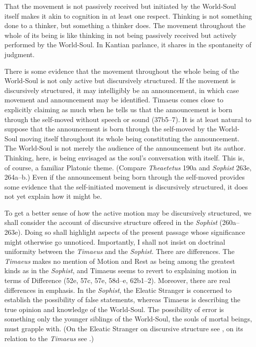 That the movement is not passively received but initiated by the World-Soul itself makes it akin to cognition in at least one respect. Thinking is not something done to a thinker, but something a thinker does. The movement throughout the whole of its being is like thinking in not being passively received but actively performed by the World-Soul. In Kantian parlance, it shares in the spontaneity of judgment.

There is some evidence that the movement throughout the whole being of the World-Soul is not only active but discursively structured. If the movement is discursively structured, it may intelligibly be an announcement, in which case movement and announcement may be identified. Timaeus comes close to explicitly claiming as much when he tells us that the announcement is born through the self-moved without speech or sound (37b5--7). It is at least natural to suppose that the announcement is born through the self-moved by the World-Soul moving itself throughout its whole being constituting the announcement. The World-Soul is not merely the audience of the announcement but its author. Thinking, here, is being envisaged as the soul's conversation with itself. This is, of course, a familiar Platonic theme. (Compare \emph{Theaetetus} 190a and \emph{Sophist} 263e, 264a--b.) Even if the announcement being born through the self-moved provides some evidence that the self-initiated movement is discursively structured, it does not yet explain how it might be.

To get a better sense of how the active motion may be discursively structured, we shall consider the account of discursive structure offered in the \emph{Sophist} (260a--263e). Doing so shall highlight aspects of the present passage whose significance might otherwise go unnoticed. Importantly, I shall not insist on doctrinal uniformity between the \emph{Timaeus} and the \emph{Sophist}. There are differences. The \emph{Timaeus} makes no mention of Motion and Rest as being among the greatest kinds as in the \emph{Sophist}, and Timaeus seems to revert to explaining motion in terms of Difference (52e, 57c, 57e, 58d--e, 62b1--2). Moreover, there are real differences in emphasis. In the \emph{Sophist}, the Eleatic Stranger is concerned to establish the possibility of false statements, whereas Timaeus is describing the true opinion and knowledge of the World-Soul. The possibility of error is something only the younger siblings of the World-Soul, the souls of mortal beings, must grapple with. (On the Eleatic Stranger on discursive structure see \citealt[]{Frede:1992ec}, on its relation to the \emph{Timaeus} see \citealt[]{Betegh:2019fq}.)

